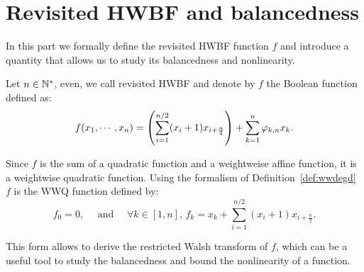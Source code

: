 \documentclass[11pt]{llncs}
\begin{document}
\section{Revisited HWBF and balancedness}

In this part we formally define the revisited HWBF function $f$ and introduce a quantity that allows us to study its balancedness and nonlinearity.

\begin{definition}\label{def:revHWBF}
Let $n\in \mathbb{N}^*$, even, we call revisited HWBF and denote by $f$ the Boolean function defined as:
\[f(x_1,\cdots,x_n)=\left(\sum_{i=1}^{n/2} (x_i+1) x_{i+\frac{n}{2}}\right) + \sum_{k=1}^n \varphi_{k,n} x_k.\]
\end{definition}



Since $f$ is the sum of a quadratic function and a weightweise affine function, it is a weightwise quadratic function. 
Using the formalism of Definition~\ref{def:wwdegd} $f$ is the WWQ function defined by:%
\[f_0=0, \quad \text{ and } \quad \forall k \in [1,n], \, f_k=x_k+\sum_{i=1}^{n/2} (x_i+1) x_{i+\frac{n}{2}}.\]

This form allows to derive the restricted Walsh transform of $f$, which can be a useful tool to study the balancedness and bound the nonlinearity of a function.
\end{document}
